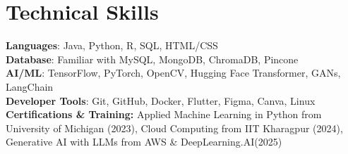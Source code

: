 \documentclass[letterpaper,11pt]{article}
\begin{document}
\section{Technical Skills}
 \begin{itemize}[leftmargin=0.15in, label={}]
    \small{\item{
     \textbf{Languages}{: Java, Python, R, SQL, HTML/CSS} \\
     \textbf{Database}{: Familiar with MySQL, MongoDB, ChromaDB, Pincone} \\
     \textbf{AI/ML}{: TensorFlow, PyTorch, OpenCV, Hugging Face Transformer, GANs, LangChain} \\
     \textbf{Developer Tools}{: Git, GitHub, Docker, Flutter, Figma, Canva, Linux} \\
     \textbf{Certifications \& Training:}{ Applied Machine Learning in Python from University of Michigan (2023), Cloud Computing from IIT Kharagpur (2024), Generative AI with LLMs from AWS \& DeepLearning.AI(2025)  }
    }}
 \end{itemize}


\end{document}
